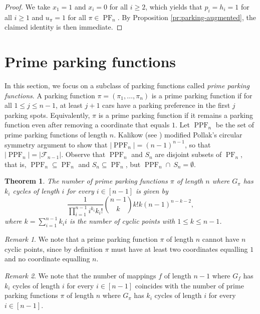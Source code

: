 \documentclass[letterpaper]{amsart}
\theoremstyle{plain}
\newtheorem{theorem}{Theorem}
\theoremstyle{definition}
\theoremstyle{remark}
\newtheorem*{remark}{Remark}
\DeclareMathOperator{\PF}{PF}
\DeclareMathOperator{\PPF}{PPF}
\begin{document}
\begin{proof}
We take $x_1=1$ and $x_i=0$ for all $i\geq 2$, which yields that $p_i=h_i=1$ for all $i \geq 1$ and $u_\pi=1$ for all $\pi \in \PF_n$. By Proposition \ref{pr:parking-augmented}, the claimed identity is then immediate.
\end{proof}

\section{Prime parking functions}
\label{sec:prime_parking}
In this section, we focus on a subclass of parking functions called {\em prime parking functions}. A parking function $\pi=(\pi_1, \ldots, \pi_n)$ is a prime parking function if for all $1 \leq j \leq n-1$, at least $j+1$ cars have a parking preference in the first $j$ parking spots. Equivalently, $\pi$ is a prime parking function if it remains a parking function even after removing a coordinate that equals $1$. Let $\PPF_n$ be the set of prime parking functions of length $n$. Kalikow (see \cite[pages 141--142]{Stanley1999}) modified Pollak's circular symmetry argument to show that
    $|\PPF_n| = (n-1)^{n-1}$, so that $|\PPF_n| = |\mathcal{F}_{n-1}|$. 
Observe that $\PPF_n$ and $S_n$ are disjoint subsets of $\PF_n$, that is, $\PPF_n \subseteq \PF_n$ and $S_n \subseteq \PF_n$, but $\PPF_n \cap \ S_n =\emptyset$.

\begin{theorem}\label{main-cycle-count: prime}
The number of prime parking functions $\pi$ of length $n$ where $G_\pi$ has $k_i$ cycles of length $i$ for every $i \in [n-1]$ is given by
\begin{equation*}
\frac{1}{\prod_{i=1}^{n-1} i^{k_i} k_i!}\binom{n-1}{k} k! k(n-1)^{n-k-2},
\end{equation*}
where $k=\sum_{i=1}^{n-1} k_i i$ is the number of cyclic points with $1\leq k \leq n-1$.
\end{theorem}

\begin{remark}
We note that a prime parking function $\pi$ of length $n$ cannot have $n$ cyclic points, since by definition $\pi$ must have at least two coordinates equalling $1$ and no coordinate equalling $n$.
\end{remark}

\begin{remark}
We note that the number of mappings $f$ of length $n-1$ where $G_f$ has $k_i$ cycles of length $i$ for every $i \in [n-1]$ coincides with the number of prime parking functions $\pi$ of length $n$ where $G_\pi$ has $k_i$ cycles of length $i$ for every $i \in [n-1]$.
\end{remark}
\end{document}
